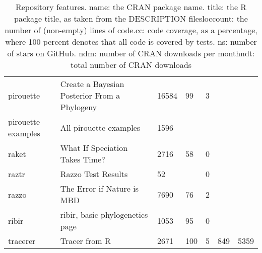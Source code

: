 \begin{table}[ht]
\begin{tabular}{p{}p{}p{}p{}p{}p{}p{}}
  pirouette & Create a Bayesian Posterior From a Phylogeny & 16584 &  99 &   3 &  &  \\ 
  pirouette examples & All pirouette examples & 1596 &  &  &  &  \\ 
  raket & What If Speciation Takes Time? & 2716 &  58 &   0 &  &  \\ 
  raztr & Razzo Test Results &  52 &  &   0 &  &  \\ 
  razzo & The Error if Nature is MBD & 7690 &  76 &   2 &  &  \\ 
  ribir & ribir, basic phylogenetics page & 1053 &  95 &   0 &  &  \\ 
  tracerer & Tracer from R & 2671 & 100 &   5 & 849 & 5359 \\ 
   \hline
\end{tabular}
\caption{Repository features. name: the CRAN package name. title: the R package title, as taken from the DESCRIPTION filesloccount: the number of (non-empty) lines of code.cc: code coverage, as a percentage, where 100 percent denotes that all code is covered by tests. ns: number of stars on GitHub. ndm: number of CRAN downloads per monthndt: total number of CRAN downloads} 
\label{tab:repos}
\end{table}
